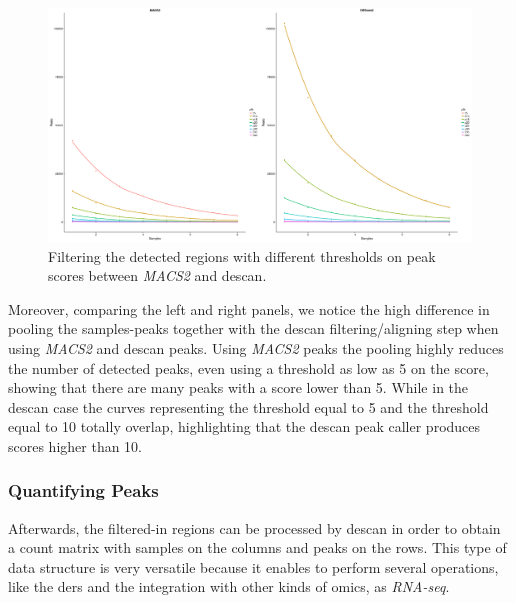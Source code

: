 \begin{figure}[H]
\includegraphics[width=\textwidth, keepaspectratio]{img/descan2/filtering_m2_d2.png}
\caption[\gls{descan} and \textit{MACS2} filtering comparison]{Filtering the detected regions with different thresholds on peak scores between \textit{MACS2} and \gls{descan}.}
\label{fig:filteringdescanmacs2}
\centering
\end{figure}


Moreover, comparing the left and right panels, we notice the high difference in pooling the samples-peaks together with the \gls{descan} filtering/aligning step when using \textit{MACS2} and \gls{descan} peaks.
Using \textit{MACS2} peaks the pooling highly reduces the number of detected peaks, even using a threshold as low as 5 on the score, showing that there are many peaks with a score lower than 5.
While in the \gls{descan} case the curves representing the threshold equal to 5 and the threshold equal to 10 totally overlap, highlighting that the \gls{descan} peak caller produces scores higher than 10.


\subsubsection{Quantifying Peaks}

Afterwards, the filtered-in regions can be processed by \gls{descan} in order to obtain a count matrix with samples on the columns and peaks on the rows.
This type of data structure is very versatile because it enables to perform several operations, like the \glspl{der} and the integration with other kinds of omics, as \textit{RNA-seq}.

